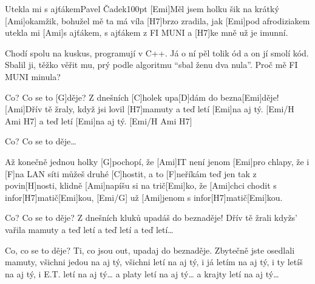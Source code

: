 \begin{song}{Utekla mi s ajťákem}{Pavel Čadek}{100pt}
%
[Emi]Měl jsem holku šik na krátký [Ami]okamžik,
bohužel mě ta má víla [H7]brzo zradila,
jak [Emi]pod afrodiziakem utekla mi [Ami]s ajťákem,
s ajťákem z FI MUNI a [H7]ke mně už je imunní.

%
Chodí spolu na kuskus, programují v C++.
Já o ní pěl tolik ód a on jí smolí kód.
Sbalil ji, těžko věřit mu, prý podle algoritmu
``sbal ženu dva nula''. Proč mě FI MUNI minula?

\chorus%
[C]Co? Co se to [G]děje?
Z dnešních [C]holek upa[D]dám do bezna[Emi]děje!
[Ami]Dřív tě žraly, když jsi lovil [H7]mamuty
a teď letí [Emi]na aj tý. [Emi/H Ami H7]{}
a teď letí [Emi]na aj tý. [Emi/H Ami H7]{}



\chorus Co? Co se to děje\dots
\pagebreak


\chorus%
[C]Až konečně jednou holky [G]pochopí,
že [Ami]IT není jenom [Emi]pro chlapy,
že i [F]na LAN síti můžeš druhé [C]hostit,
a to [F]neříkám teď jen tak z povin[H]nosti,
klidně [Ami]napíšu si na trič[Emi]ko,
že [Ami]chci chodit s infor[H7]matič[Emi]kou, [Emi/G]{}
už [Ami]jenom s infor[H7]matič[Emi]kou.

\chorus%
Co? Co se to děje?
Z dnešních kluků upadáš do beznaděje!
Dřív tě žrali kdyžs' vařila mamuty
a teď letí a teď letí a teď letí\dots

\chorus%
Co, co se to děje?
Ti, co jsou out, upadaj do beznaděje.
Zbytečně jste osedlali mamuty,
všichni jedou na aj tý,
všichni letí na aj tý,
i já letím na aj tý,
i ty letíš na aj tý,
i E.T. letí na aj tý\dots
a platy letí na aj tý\dots
a krajty letí na aj tý\dots
\end{song}
